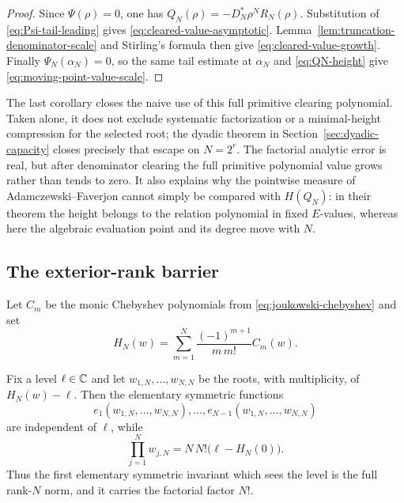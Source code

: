 \begin{proof}
Since $\Psi(\rho)=0$, one has
$Q_N(\rho)=-D_N^*\rho^N R_N(\rho)$.  Substitution of
\eqref{eq:Psi-tail-leading} gives \eqref{eq:cleared-value-asymptotic}.
Lemma~\ref{lem:truncation-denominator-scale} and Stirling's formula then
give \eqref{eq:cleared-value-growth}.  Finally
$\Psi_N(\alpha_N)=0$, so the same tail estimate at $\alpha_N$ and
\eqref{eq:QN-height} give \eqref{eq:moving-point-value-scale}.
\end{proof}

The last corollary closes the naive use of this full primitive clearing
polynomial.  Taken alone, it does not exclude systematic factorization or a
minimal-height compression for the selected root; the dyadic theorem in
Section~\ref{sec:dyadic-capacity} closes precisely that escape on
\(N=2^r\).  The factorial analytic
error is real, but after denominator clearing the full primitive polynomial
value grows rather than tends to zero.  It also explains
why the pointwise measure of Adamczewski--Faverjon cannot simply be compared
with $H(Q_N)$: in their theorem the height belongs to the relation
polynomial in fixed $E$-values, whereas here the algebraic evaluation point
and its degree move with $N$.

\subsection{The exterior-rank barrier}

Let $C_m$ be the monic Chebyshev polynomials from
\eqref{eq:joukowski-chebyshev} and set
\begin{equation}\label{eq:HN-truncation}
 H_N(w)=\sum_{m=1}^N\frac{(-1)^{m+1}}{m\,m!}C_m(w).
\end{equation}

\begin{theorem}
\label{thm:top-norm-barrier}
Fix a level $\ell\in\mathbb C$ and let
$w_{1,N},\ldots,w_{N,N}$ be the roots, with multiplicity, of
$H_N(w)-\ell$.  Then the elementary symmetric functions
\[
 e_1(w_{1,N},\ldots,w_{N,N}),\ldots,
 e_{N-1}(w_{1,N},\ldots,w_{N,N})
\]
are independent of $\ell$, while
\begin{equation}\label{eq:top-norm-exact}
 \boxed{
 \prod_{j=1}^N w_{j,N}
 =N\,N!\bigl(\ell-H_N(0)\bigr).}
\end{equation}
Thus the first elementary symmetric invariant which sees the level is the full
rank-$N$ norm, and it carries the factorial factor $N!$.
\end{theorem}

